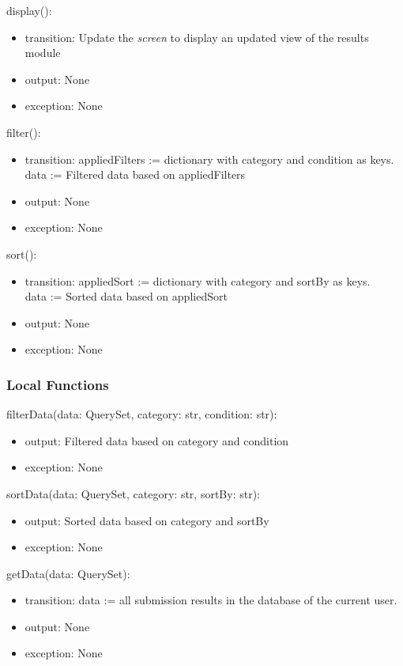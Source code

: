 \documentclass[12pt, titlepage]{article}
\begin{document}
\noindent display():
\begin{itemize}
\item transition: Update the \textit{screen} to display an updated view of the results module
\item output: None
\item exception: None
\end{itemize}

\noindent filter():
\begin{itemize}
\item transition: appliedFilters := dictionary with category and condition as keys. \\
data := Filtered data based on appliedFilters
\item output: None
\item exception: None
\end{itemize}

\noindent sort():
\begin{itemize}
\item transition: appliedSort := dictionary with category and sortBy as keys. \\
data := Sorted data based on appliedSort
\item output: None
\item exception: None
\end{itemize}

\subsubsection{Local Functions}

\noindent filterData(data: QuerySet, category: str, condition: str):
\begin{itemize}
\item output: Filtered data based on category and condition
\item exception: None
\end{itemize}

\noindent sortData(data: QuerySet, category: str, sortBy: str):
\begin{itemize}
\item output: Sorted data based on category and sortBy
\item exception: None
\end{itemize}

\noindent getData(data: QuerySet):
\begin{itemize}
\item transition: data := all submission results in the database of the current user.
\item output: None
\item exception: None
\end{itemize}
\end{document}
